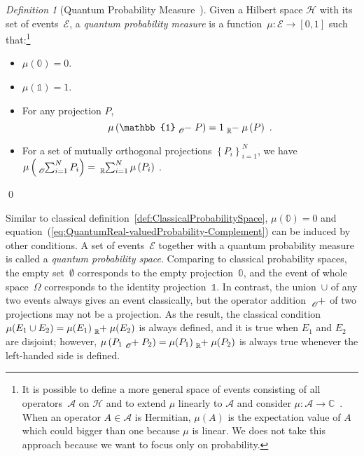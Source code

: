 \documentclass{article}
\theoremstyle{remark}
\newtheorem{definition}{Definition}
\newcommand{\events}{\ensuremath{\mathcal{E}}}
\newcommand{\pmeas}{\ensuremath{\mu}}
\newcommand{\Hilb}{\mathcal{H}}
\def\C{{\mathbb{C}}}
\begin{document}
\begin{definition}[Quantum Probability Measure~\cite{10.2307/2308516,gleason1957,Redhead1987-REDINA,Maassen2010}]\label{def:QuantumProbabilitySpace}
Given a Hilbert space $\Hilb$ with its set of events~$\events$,
a \emph{quantum probability measure} is a function~$\mu:\events\rightarrow[0,1]$
such that:\footnote{It is possible to define a more general space of events consisting
of all operators~$\mathcal{A}$ on $\Hilb$ and to extend $\mu$
linearly to $\mathcal{A}$ and consider $\mu:\mathcal{A}\rightarrow\C$~\cite{Maassen2010,Swart2013}.
When an operator $A\in\mathcal{A}$ is Hermitian, $\mu\left(A\right)$
is the expectation value of $A$ which could bigger than one because
$\mu$ is linear. We does not take this approach because we want to
focus only on probability. } 
\begin{itemize}
\item $\mu(\mathbb{0})=0$. 
\item $\mu(\mathbb{1})=1$. 
\item For any projection $P$, 
\begin{equation}
\mu\left(\mathbb{1}\tensor*[_{\mathscr{O}}]{-}{}P\right)=1\tensor*[_{\mathbb{R}}]{-}{}\mu\left(P\right)\textrm{ .}\label{eq:QuantumReal-valuedProbability-Complement}
\end{equation}
\item For a set of mutually orthogonal projections $\left\{ P_{i}\right\} _{i=1}^{N}$,
we have $\mu\left(\tensor*[_{\mathscr{O}}]{\sum}{_{i=1}^{N}}P_{i}\right)=\tensor*[_{\mathbb{R}}]{\sum}{_{i=1}^{N}}\mu\left(P_{i}\right)$
. 
\end{itemize}
\qed\end{definition}

Similar to classical definition~\ref{def:ClassicalProbabilitySpace},
$\mu(\mathbb{0})=0$ and equation~(\ref{eq:QuantumReal-valuedProbability-Complement})
can be induced by other conditions. A set of events~$\events$ together
with a quantum probability measure is called a \emph{quantum probability
space}. Comparing to classical probability spaces, the empty set~$\emptyset$
corresponds to the empty projection~$\mathbb{0}$, and the event
of whole space~$\Omega$ corresponds to the identity projection~$\mathbb{1}$.
In contrast, the union~$\cup$ of any two events always gives an
event classically, but the operator addition~$\tensor*[_{\mathscr{O}}]{+}{}$
of two projections may not be a projection. As the result, the classical
condition~$\pmeas(E_{1}\cup E_{2})=\pmeas(E_{1})\tensor*[_{\mathbb{R}}]{+}{}\pmeas(E_{2})$
is always defined, and it is true when $E_{1}$ and $E_{2}$ are disjoint;
however, $\mu\left(P_{1}\tensor*[_{\mathscr{O}}]{+}{}P_{2}\right)=\mu(P_{1})\tensor*[_{\mathbb{R}}]{+}{}\mu(P_{2})$
is always true whenever the left-handed side is defined.
\end{document}
